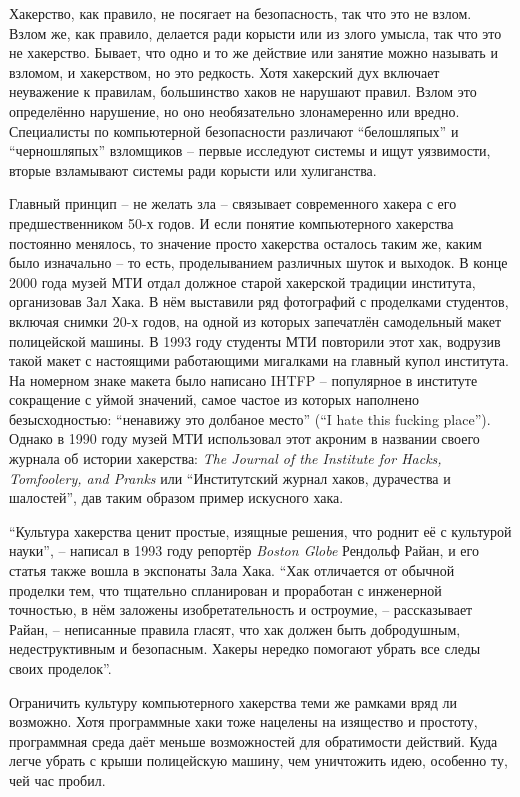 Хакерство, как правило, не посягает на безопасность, так что это не взлом. Взлом же, как правило, делается ради корысти или из злого умысла, так что это не хакерство. Бывает, что одно и то же действие или занятие можно называть и взломом, и хакерством, но это редкость. Хотя хакерский дух включает неуважение к правилам, большинство хаков не нарушают правил. Взлом это определённо нарушение, но оно необязательно злонамеренно или вредно. Специалисты по компьютерной безопасности различают \enquote{белошляпых} и \enquote{черношляпых} взломщиков -- первые исследуют системы и ищут уязвимости, вторые взламывают системы ради корысти или хулиганства.

Главный принцип -- не желать зла -- связывает современного хакера с его предшественником 50-х годов. И если понятие компьютерного хакерства постоянно менялось, то значение просто хакерства осталось таким же, каким было изначально -- то есть, проделыванием различных шуток и выходок. В конце 2000 года музей МТИ отдал должное старой хакерской традиции института, организовав Зал Хака. В нём выставили ряд фотографий с проделками студентов, включая снимки 20-х годов, на одной из которых запечатлён самодельный макет полицейской машины. В 1993 году студенты МТИ повторили этот хак, водрузив такой макет с настоящими работающими мигалками на главный купол института. На номерном знаке макета было написано IHTFP -- популярное в институте сокращение с уймой значений, самое частое из которых наполнено безысходностью: \enquote{ненавижу это долбаное место} (\enquote{I hate this fucking place}). Однако в 1990 году музей МТИ использовал этот акроним в названии своего журнала об истории хакерства: \textit{The Journal of the Institute for Hacks, Tomfoolery, and Pranks} или \enquote{Институтский журнал хаков, дурачества и шалостей}, дав таким образом пример искусного хака.

\enquote{Культура хакерства ценит простые, изящные решения, что роднит её с культурой науки}, -- написал в 1993 году репортёр \textit{Boston Globe} Рендольф Райан, и его статья также вошла в экспонаты Зала Хака. \enquote{Хак отличается от обычной проделки тем, что тщательно спланирован и проработан с инженерной точностью, в нём заложены изобретательность и остроумие, -- рассказывает Райан, -- неписанные правила гласят, что хак должен быть добродушным, недеструктивным и безопасным. Хакеры нередко помогают убрать все следы своих проделок}.

Ограничить культуру компьютерного хакерства теми же рамками вряд ли возможно. Хотя программные хаки тоже нацелены на изящество и простоту, программная среда даёт меньше возможностей для обратимости действий. Куда легче убрать с крыши полицейскую машину, чем уничтожить идею, особенно ту, чей час пробил.

